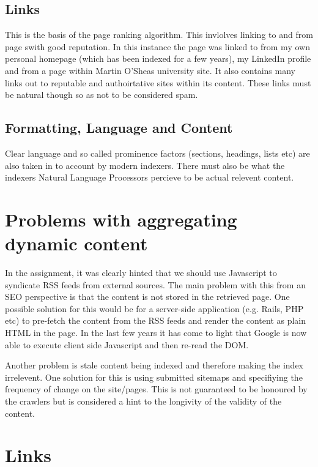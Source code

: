 \documentclass[a4paper,11pt]{article}
\begin{document}
\subsection{Links}
This is the basis of the page ranking algorithm.  This invlolves linking to and from page swith good reputation. In this instance the page was linked to from my own personal homepage (which has been indexed for a few years), my LinkedIn profile and from a page within Martin O'Sheas university site.  It also contains many links out to reputable and authoirtative sites within its content.  These links must be natural though so as not to be considered spam.

\subsection{Formatting, Language and Content}
Clear language and so called prominence factors (sections, headings, lists etc) are also taken in to account by modern indexers.  There must also be what the indexers Natural Language Processors percieve to be actual relevent content.

\newpage

\section{Problems with aggregating dynamic content}

In the assignment, it was clearly hinted that we should use Javascript to syndicate RSS feeds from external sources.  The main problem with this from an SEO perspective is that the content is not stored in the retrieved page.  One possible solution for this would be for a server-side application (e.g. Rails, PHP etc) to pre-fetch the content from the RSS feeds and render the content as plain HTML in the page.
In the last few years it has come to light that Google is now able to execute client side Javascript and then re-read the DOM.

Another problem is stale content being indexed and therefore making the index irrelevent.  One solution for this is using submitted sitemaps and specifiying the frequency of change on the site/pages.  This is not guaranteed to be honoured by the crawlers but is considered a hint to the longivity of the validity of the content.

\section*{Links}
\end{document}
